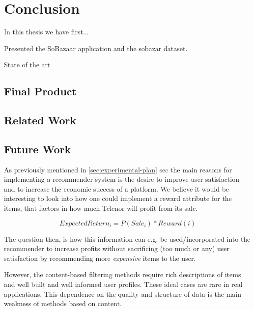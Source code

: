 
\chapter{Conclusion}
\label{chap:conclusion}
\minitoc

In this thesis we have first...

Presented the SoBazaar application and the sobazar dataset.

State of the art


\clearpage

\section{Final Product}


\section{Related Work}


\section{Future Work}



As previously mentioned in \ref{sec:experimental-plan} sec the main reasons for implementing a recommender
system is the desire to improve user satisfaction and to increase the economic success of a platform.
We believe it would be interesting to look into how one could implement a reward attribute for the
items, that factors in how much Telenor will profit from its sale.

\begin{equation}
ExpectedReturn_i = P(Sale_i) * Reward(i)
\end{equation}

The question then, is how this information can e.g. be used/incorporated into the recommender to
increase profits without sacrificing (too much or any) user satisfaction by recommending
more \emph{expensive} items to the user.


However, the content-based filtering methods require rich descriptions of items and well built
and well informed user profiles. These ideal cases are rare in real applications. This dependence
on the quality and structure of data is the main weakness of methods based on content.


